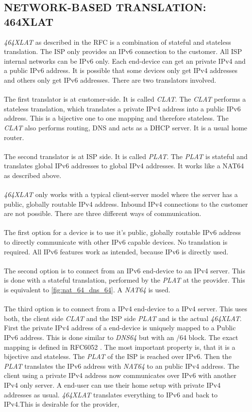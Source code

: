 \documentclass[format=sigconf, natbib=true, nonacm=true]{acmart}
\begin{document}
    \subsection{NETWORK-BASED TRANSLATION: 464XLAT}
    \textit{464XLAT} as described in the RFC \cite{rfc6877} is a combination of stateful and stateless translation. The ISP only provides an IPv6 connection to the customer. All ISP internal networks can be IPv6 only. Each end-device can get an private IPv4 and a public IPv6 address. It is possible that some devices only get IPv4 addresses and others only get IPv6 addresses. There are two translators involved.\\\\The first translator is at customer-side. It is called \textit{CLAT}. The \textit{CLAT} performs a stateless translation, which translates a private IPv4 address into a public IPv6 address. This is a bijective one to one mapping and therefore stateless. The \textit{CLAT} also performs routing, DNS and acts as a DHCP server. It is a usual home router.\\\\The second translator is at ISP side. It is called \textit{PLAT}. The \textit{PLAT} is stateful and translates global IPv6 addresses to global IPv4 addresses. It works like a NAT64 as described above.\\\\\textit{464XLAT} only works with a typical client-server model where the server has a public, globally routable IPv4 address. Inbound IPv4 connections to the customer are not possible. There are three different ways of communication.\\\\The first option for a device is to use it's public, globally routable IPv6 address to directly communicate with other IPv6 capable devices. No translation is required. All IPv6 features work as intended, because IPv6 is directly used.\\\\The second option is to connect from an IPv6 end-device to an IPv4 server. This is done with a stateful translation, performed by the \textit{PLAT} at the provider. This is equivalent to \ref{fig:nat_64_dns_64}. A \textit{NAT64} is used.\\\\The third option is to connect from a IPv4 end-device to a IPv4 server. This uses both, the client side \textit{CLAT} and the ISP side \textit{PLAT} and is the actual \textit{464XLAT}. First the private IPv4 address of a end-device is uniquely mapped to a Public IPv6 address. This is done similar to \textit{DNS64} but with an /64 block. The exact mapping is defined in RFC6052 \cite{rfc6052}. The most important property is, that it is a bijective and stateless. The \textit{PLAT} of the ISP is reached over IPv6. Then the \textit{PLAT} translates the IPv6 address with \textit{NAT64} to an public IPv4 address. The client using a private IPv4 address now communicates over IPv6 with another IPv4 only server. A end-user can use their home setup with private IPv4 addresses as usual. \textit{464XLAT} translates everything to IPv6 and back to IPv4.This is desirable for the provider, 
\end{document}
